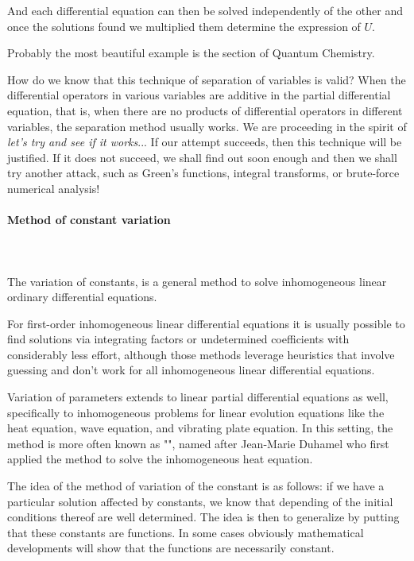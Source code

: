 	And each differential equation can then be solved independently of the other and once the solutions found we multiplied them determine the expression of $U$.
	\begin{tcolorbox}[title=Remark,colframe=black,arc=10pt]
	Probably the most beautiful example is the section of Quantum Chemistry.
	\end{tcolorbox}
	How do we know that this technique of separation of variables is valid? When the differential operators in various variables are additive in the partial differential equation, that is, when there are no products of differential operators in different variables, the separation method usually works. We are proceeding in the spirit of \textit{let’s try and see if it works}... If our attempt succeeds, then this technique will be justified. If it does not succeed, we shall find out soon enough and then we shall try another attack, such as Green’s functions, integral transforms, or brute-force numerical analysis!
	
	\paragraph{Method of constant variation}\mbox{}\\\\
	The variation of constants, is a general method to solve inhomogeneous linear ordinary differential equations.

	For first-order inhomogeneous linear differential equations it is usually possible to find solutions via integrating factors or undetermined coefficients with considerably less effort, although those methods leverage heuristics that involve guessing and don't work for all inhomogeneous linear differential equations.

	Variation of parameters extends to linear partial differential equations as well, specifically to inhomogeneous problems for linear evolution equations like the heat equation, wave equation, and vibrating plate equation. In this setting, the method is more often known as "", named after Jean-Marie Duhamel who first applied the method to solve the inhomogeneous heat equation.
	
	The idea of the method of variation of the constant is as follows: if we have a particular solution affected by constants, we know that depending of the initial conditions thereof are well determined. The idea is then to generalize by putting that these constants are functions. In some cases obviously mathematical developments will show that the functions are necessarily constant.
	
